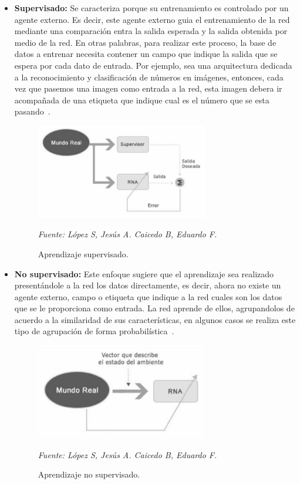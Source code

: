 \begin{itemize}
\item \textbf{Supervisado: } Se caracteriza porque su entrenamiento es controlado por un agente
externo. Es decir, este agente externo guia el entrenamiento de la red mediante una comparación entra la salida esperada y la salida obtenida por medio de la red. En otras palabras, para realizar este proceso, la base de datos a entrenar necesita contener un campo que indique la salida que se espera por cada dato de entrada. Por ejemplo, sea una arquitectura dedicada a la reconocimiento y clasificación de números en imágenes, entonces, cada vez que pasemos una imagen como entrada a la red, esta imagen debera ir acompañada de una etiqueta que indique cual es el número que se esta pasando~\cite{18restrepo2015aplicacion}.

\begin{figure}[H]
		\centering
		\includegraphics[width=75mm]{Imagenes/grafico_supervisado.png}
		\caption{Aprendizaje supervisado.}
		\vspace{0.15cm}
		\textit{Fuente: López S, Jesús A. Caicedo B, Eduardo F.}
		\label{fig:grafico_supervisado}
\end{figure}



\item \textbf{No supervisado: }
Este enfoque sugiere que el aprendizaje sea realizado presentándole a la red los datos directamente, es decir, ahora no existe un agente externo, campo o etiqueta que indique a la red cuales son los datos que se le proporciona como entrada. La red aprende de ellos, agrupandolos de acuerdo a la similaridad de sus características, en algunos casos se realiza este tipo de agrupación de forma probabilística~\cite{18restrepo2015aplicacion}.

\begin{figure}[H]
		\centering
		\includegraphics[width=75mm]{Imagenes/grafico_no_supervisado.png}
		\caption{Aprendizaje no supervisado.}
		\vspace{0.15cm}
		\textit{Fuente: López S, Jesús A. Caicedo B, Eduardo F.}
		\label{fig:grafico_no_supervisado}
\end{figure}


\end{itemize}
